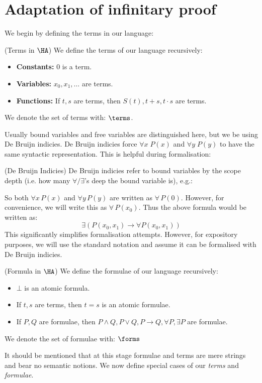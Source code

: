 \chapter{Adaptation of infinitary proof}

We begin by defining the terms in our language:
\begin{cthdefinition}{(Terms in $\HA$)}
    We define the terms of our language recursively:
    \begin{itemize}[noitemsep]
        \item \textbf{Constants:} $0$ is a term.
        \item \textbf{Variables:} $x_0, x_1, \dots$ are terms.
        \item \textbf{Functions:} If $t, s$ are terms, then $S(t), t+s, t\cdot s$ are terms.
    \end{itemize}
    We denote the set of terms with: $\terms$.
\end{cthdefinition}

Usually bound variables and free variables are distinguished here, but we be using De Bruijn indicies. De Bruijn indicies force \(\forall x \; P(x)\) and \(\forall y\; P(y)\) to have the same syntactic representation. This is helpful during formalisation:

\begin{cthremark}{(De Bruijn Indicies)}
De Bruijn indicies refer to bound variables by the scope depth (i.e. how many \(\forall/\exists\)'s deep the bound variable is), e.g.:



So both \(\forall x\,P(x)\) and \(\forall y\,P(y)\) are written as \(\forall\,P(0)\). However, for convenience, we will write this as \(\forall\,P(x_0)\). Thus the above formula would be written as:
\[ \exists \left( P(x_0,x_1) \to \forall P(x_0,x_1) \right) \]
This significantly simplifies formalisation attempts. However, for expository purposes, we will use the standard notation and assume it can be formalised with De Bruijn indicies.
\end{cthremark}

\begin{cthdefinition}{(Formula in $\HA$)}
    We define the formulae of our language recursively:
    \begin{itemize}[noitemsep]
        \item $\bot$ is an atomic formula.
        \item If $t,s$ are terms, then $t=s$ is an atomic formulae.
        \item If $P,Q$ are formulae, then $P \land Q, P \lor Q, P \to Q, \forall P, \exists P$ are formulae.
    \end{itemize}
    We denote the set of formulae with: $\forms$
\end{cthdefinition}
It should be mentioned that at this stage formulae and terms are mere strings and bear no semantic notions. We now define special cases of our \emph{terms} and \emph{formulae}.


